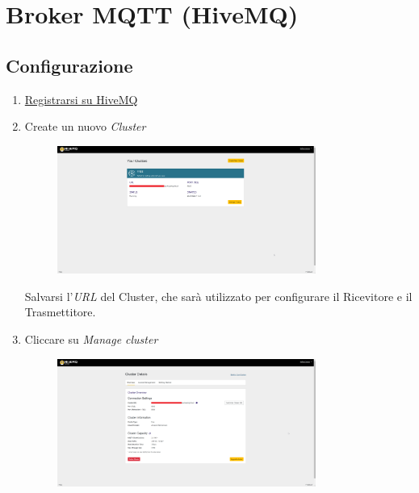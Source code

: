 \documentclass[a4paper,11pt]{article}
\begin{document}
\section{Broker MQTT (HiveMQ)}
\label{sec:Broker}

  \subsection{Configurazione}

    \begin{enumerate}
      \item \href{https://console.hivemq.cloud/}{Registrarsi su HiveMQ}
      \item Create un nuovo \emph{Cluster}
        \begin{figure}[H]
          \centering
          \includegraphics[width=0.8\textwidth,height=\textheight,keepaspectratio]{assets/hivemq_clusters}
        \end{figure}

        Salvarsi l'\emph{URL} del Cluster, che sarà utilizzato per configurare il Ricevitore e il Trasmettitore.

      \item Cliccare su \emph{Manage cluster}
        \begin{figure}[H]
          \centering
          \includegraphics[width=0.8\textwidth,height=\textheight,keepaspectratio]{assets/hivemq_clusterdetails}
        \end{figure}


\end{enumerate}
\end{document}
